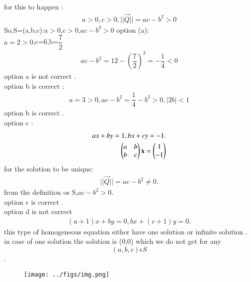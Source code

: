 \documentclass[journal,12pt,onecolumn]{IEEEtran}
\begin{document}
for this to happen :
\\
\begin{align*}
    a>0,c>0,||\vec{Q}||=ac-b^2>0 
\end{align*}
So,S={(a,b,c):$a>0$,$c>0$,$ac-b^2>0$}
option (a):
\\
$a=2>0$,c=6,b=$\dfrac{7}{2}$
\\
\begin{align*}
    ac-b^2=12-(\dfrac{7}{2})^2=-\dfrac{1}{4}<0
\end{align*}
option a is not correct .
\\
option b is correct :
\\
\begin{align*}
    a=3>0,ac-b^2=\dfrac{1}{4}-b^2>0,|2b|<1
\end{align*}
option b  is correct .
\\
option c :
\\
\begin{align*}
    ax+by=1,bx+cy=-1.
    \\
    \begin{pmatrix}a&b\\b&c\end{pmatrix}\mathbf{x}=\begin{pmatrix}1\\-1\end{pmatrix}
\end{align*}
for the solution to be unique:
\\
\begin{align*}
    ||\vec{Q}||=ac-b^2\neq0.
\end{align*}
from the definition os S,$ac-b^2>0$.
\\
option c is correct .
\\
option d is not correct 
\\
\begin{align*}
    (a+1)x+by=0,bx+(c+1)y=0.
\end{align*}
this type of homogeneous equation either have one solution or infinite solution .
\\
in case of one solution the solution is (0,0) which we do not get for any $$(a,b,c)\epsilon S$$.
        \begin{figure}[H]
    \centering
    \texttt{[image: ../figs/img.png]}
    \caption*{}
    \label{figs}
\end{figure}
\end{document}
